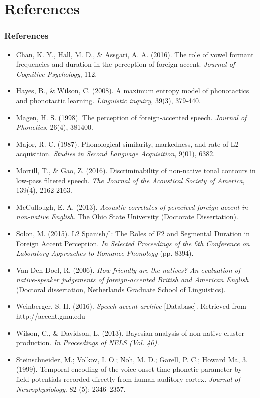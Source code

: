 \documentclass{beamer}
\begin{document}
\section{References}
\begin{frame}[shrink=20]
\frametitle{References}
\footnotesize{
\begin{itemize}
\item Chan, K. Y., Hall, M. D., \& Assgari, A. A. (2016). The role of vowel formant frequencies and duration in the perception of foreign accent. \emph {Journal of Cognitive Psychology}, 1\textendash{}12.
\item Hayes, B., \& Wilson, C. (2008). A maximum entropy model of phonotactics and phonotactic learning. \emph{Linguistic inquiry}, 39(3), 379-440.
\item Magen, H. S. (1998). The perception of foreign-accented speech. \emph{Journal of Phonetics}, 26(4), 381\textendash{}400.
\item Major, R. C. (1987). Phonological similarity, markedness, and rate of L2 acquisition. \emph{Studies in Second Language Acquisition}, 9(01), 63\textendash{}82.
\item Morrill, T., \& Gao, Z. (2016). Discriminability of non-native tonal contours in low-pass filtered speech. \emph{The Journal of the Acoustical Society of America}, 139(4), 2162-2163.
\item McCullough, E. A. (2013). \emph{Acoustic correlates of perceived foreign accent in non-native English}. The Ohio State University (Doctorate Dissertation). 
\item Solon, M. (2015). L2 Spanish/l: The Roles of F2 and Segmental Duration in Foreign Accent Perception. \emph{In Selected Proceedings of the 6th Conference on Laboratory Approaches to Romance Phonology} (pp. 83\textendash{}94). 
\item Van Den Doel, R. (2006). \emph{How friendly are the natives? An evaluation of native-speaker judgements of foreign-accented British and American English }(Doctoral dissertation, Netherlands Graduate School of Linguistics).
\item Weinberger, S. H. (2016). \emph{Speech accent archive }[Database]. Retrieved from http://accent.gmu.edu
\item Wilson, C., \& Davidson, L. (2013). Bayesian analysis of non-native cluster production. \emph{In Proceedings of NELS (Vol. 40).} 
\item Steinschneider, M.; Volkov, I. O.; Noh, M. D.; Garell, P. C.; Howard Ma, 3. (1999). Temporal encoding of the voice onset time phonetic parameter by field potentials recorded directly from human auditory cortex. \emph{Journal of Neurophysiology}. 82 (5): 2346–2357.

\end{itemize}}
\end{frame}
\end{document}
